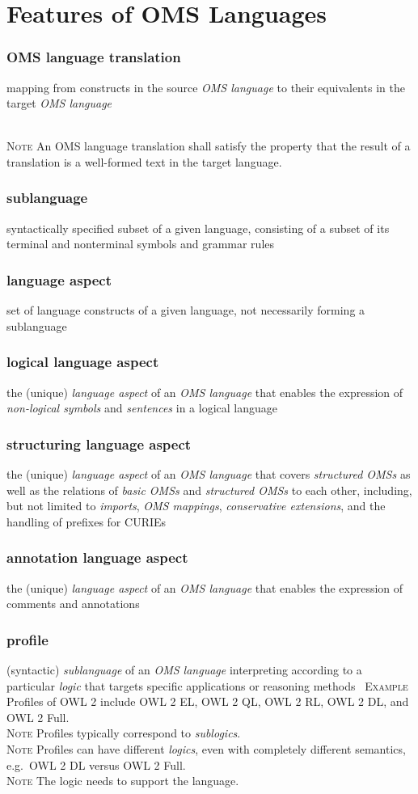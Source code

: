 \documentclass[10pt,%
\ifpretendfinal
final%
\else
draft%
\fi,
]{scrreprt}
\newcommand*{\termref}[1]{\textit{#1}}
\newcommand{\sclause}[1]{\section{#1}}
\newcommand{\termdefinition}[2]{\subsubsection*{\normalsize #1}#2}
\newenvironment{definitions}[0]{\medskip }{}
\newenvironment{note}[0]{\ \\ \textsc{Note} \quad}{}
\newenvironment{example}[0]{\ \newline \textsc{Example}\quad }{}
\begin{document}
\sclause{Features of OMS Languages}
 
\begin{definitions}
  \termdefinition{OMS language translation}{mapping from constructs in the source \termref{OMS language} to their equivalents in the target \termref{OMS language}}

\begin{note}
  An OMS language translation shall satisfy the property that the
  result of a translation is a well-formed text in the target
  language.
\end{note}

  \termdefinition{sublanguage}{syntactically specified subset of a given language, consisting of a subset of its terminal and nonterminal symbols and grammar rules}

 \termdefinition{language aspect}{set of language constructs of a given language, not necessarily forming a sublanguage}

  \termdefinition{logical language aspect}{the (unique) \termref{language aspect} of an \termref{OMS language} that enables the expression of \termref{non-logical symbols} and \termref{sentences} in a logical language}

  \termdefinition{structuring language aspect}{the (unique) \termref{language aspect} of an \termref{OMS language} that covers \termref{structured OMSs} as well as the relations of \termref{basic OMSs} and \termref{structured OMSs} to each other, including, but not limited to \termref{imports}, \termref{OMS mappings}, \termref{conservative extensions}, and the handling of prefixes for CURIEs}

  \termdefinition{annotation language aspect}{the (unique) \termref{language aspect} of an \termref{OMS language} that enables the  expression of comments and annotations}

  \termdefinition{profile}{(syntactic) \termref{sublanguage} of an \termref{OMS language} interpreting according to a particular \termref{logic}
that targets specific applications or reasoning methods}
  \begin{example}
    Profiles of OWL 2 include OWL 2 EL, OWL 2 QL, OWL 2 RL, OWL 2 DL, and OWL 2 Full.
  \end{example}
  \begin{note}
  Profiles typically correspond to \termref{sublogics}.
  \end{note}
  \begin{note}
  Profiles can have different \termref{logics}, even with completely
  different semantics, e.g.\ OWL 2 DL versus OWL 2 Full.
  \end{note}
  \begin{note}
    The logic needs to support the language.
  \end{note}
  
\end{definitions}
\end{document}
